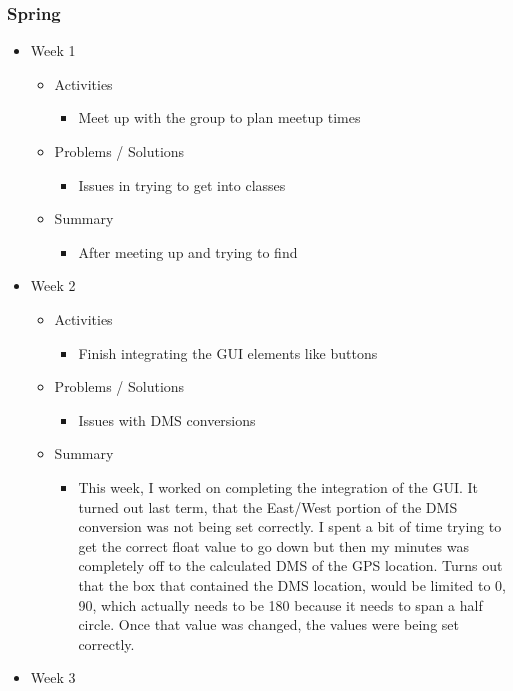 \subsubsection{Spring}
\begin{itemize}
\item Week 1
\begin{itemize}
\item Activities
\begin{itemize}
\item Meet up with the group to plan meetup times
\end{itemize}
\item Problems / Solutions
\begin{itemize}
\item Issues in trying to get into classes
\end{itemize}
\item Summary
\begin{itemize}
\item After meeting up and trying to find 
\end{itemize}
\end{itemize}
\item Week 2
\begin{itemize}
\item Activities
\begin{itemize}
\item Finish integrating the GUI elements like buttons
\end{itemize}
\item Problems / Solutions
\begin{itemize}
\item Issues with DMS conversions
\end{itemize}
\item Summary
\begin{itemize}
\item This week, I worked on completing the integration of the GUI. It turned out last term, that the East/West portion of the DMS conversion was not being set correctly. I spent a bit of time trying to get the correct float value to go down but then my minutes was completely off to the calculated DMS of the GPS location. Turns out that the box that contained the DMS location, would be limited to 0, 90, which actually needs to be 180 because it needs to span a half circle. Once that value was changed, the values were being set correctly.
\end{itemize}
\end{itemize}
\item Week 3

\end{itemize}
